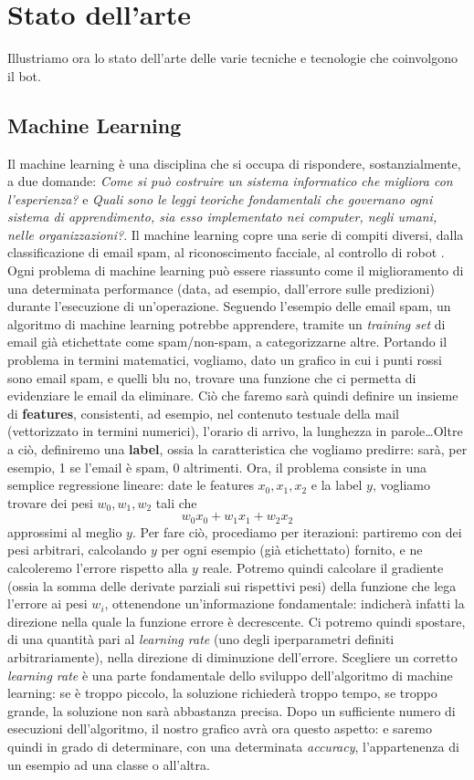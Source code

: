 \chapter{Stato dell'arte}
\label{chap:stateofart}
Illustriamo ora lo stato dell'arte delle varie tecniche e tecnologie che coinvolgono il bot.
\section{Machine Learning}
Il machine learning è una disciplina che si occupa di rispondere, sostanzialmente, a due domande: \textit{Come si può costruire un sistema informatico che migliora con l'esperienza?} e \textit{Quali sono le leggi teoriche fondamentali che governano ogni sistema di apprendimento, sia esso implementato nei computer, negli umani, nelle organizzazioni?}. Il machine learning copre una serie di compiti diversi, dalla classificazione di email spam, al riconoscimento facciale, al controllo di robot \cite{book:mitchell1997machine}. Ogni problema di machine learning può essere riassunto come il miglioramento di una determinata performance (data, ad esempio, dall'errore sulle predizioni) durante l'esecuzione di un'operazione. Seguendo l'esempio delle email spam, un algoritmo di machine learning potrebbe apprendere, tramite un \textit{training set} di email già etichettate come spam/non-spam, a categorizzarne altre.
Portando il problema in termini matematici, vogliamo, dato un grafico
in cui i punti rossi sono email spam, e quelli blu no, trovare una funzione che ci permetta di evidenziare le email da eliminare. Ciò che faremo sarà quindi definire un insieme di \textbf{features}, consistenti, ad esempio, nel contenuto testuale della mail (vettorizzato in termini numerici), l'orario di arrivo, la lunghezza in parole\dots Oltre a ciò, definiremo una \textbf{label}, ossia la caratteristica che vogliamo predirre: sarà, per esempio, 1 se l'email è spam, 0 altrimenti. Ora, il problema consiste in una semplice regressione lineare: date le features $x_0, x_1, x_2$ e la label $y$, vogliamo trovare dei pesi $w_0, w_1, w_2$ tali che
\begin{displaymath}
    w_0x_0+w_1x_1+w_2x_2
\end{displaymath}
approssimi al meglio $y$. Per fare ciò, procediamo per iterazioni: partiremo con dei pesi arbitrari, calcolando $y$ per ogni esempio (già etichettato) fornito, e ne calcoleremo l'errore rispetto alla $y$ reale. Potremo quindi calcolare il gradiente (ossia la somma delle derivate parziali sui rispettivi pesi) della funzione che lega l'errore ai pesi $w_i$, ottenendone un'informazione fondamentale: indicherà infatti la direzione nella quale la funzione errore è decrescente. Ci potremo quindi spostare, di una quantità pari al \textit{learning rate} (uno degli iperparametri definiti arbitrariamente), nella direzione di diminuzione dell'errore. Scegliere un corretto \textit{learning rate} è una parte fondamentale dello sviluppo dell'algoritmo di machine learning: se è troppo piccolo, la soluzione richiederà troppo tempo, se troppo grande, la soluzione non sarà abbastanza precisa. Dopo un sufficiente numero di esecuzioni dell'algoritmo, il nostro grafico avrà ora questo aspetto:
e saremo quindi in grado di determinare, con una determinata \textit{accuracy}, l'appartenenza di un esempio ad una classe o all'altra.